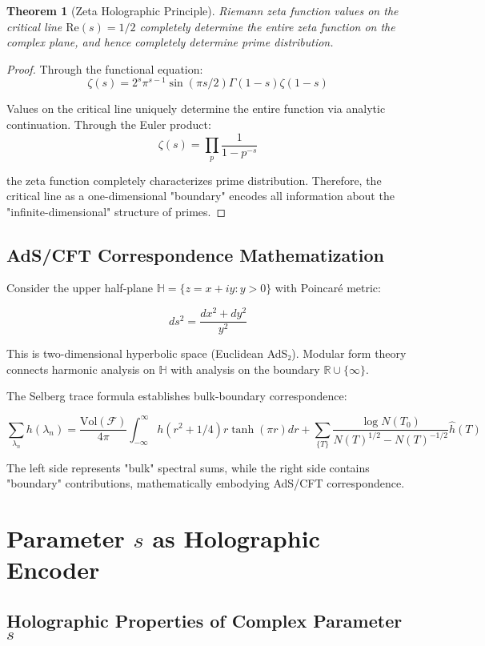 \documentclass[12pt]{article}
\newtheorem{theorem}{Theorem}[section]
\begin{document}
\begin{theorem}[Zeta Holographic Principle]
Riemann zeta function values on the critical line $\text{Re}(s) = 1/2$ completely determine the entire zeta function on the complex plane, and hence completely determine prime distribution.
\end{theorem}

\begin{proof}
Through the functional equation:
$$\zeta(s) = 2^s\pi^{s-1}\sin(\pi s/2)\Gamma(1-s)\zeta(1-s)$$

Values on the critical line uniquely determine the entire function via analytic continuation. Through the Euler product:
$$\zeta(s) = \prod_p \frac{1}{1-p^{-s}}$$

the zeta function completely characterizes prime distribution. Therefore, the critical line as a one-dimensional "boundary" encodes all information about the "infinite-dimensional" structure of primes.
\end{proof}

\subsection{AdS/CFT Correspondence Mathematization}

Consider the upper half-plane $\mathbb{H} = \{z = x + iy : y > 0\}$ with Poincaré metric:

$$ds^2 = \frac{dx^2 + dy^2}{y^2}$$

This is two-dimensional hyperbolic space (Euclidean AdS₂). Modular form theory connects harmonic analysis on $\mathbb{H}$ with analysis on the boundary $\mathbb{R} \cup \{\infty\}$.

The Selberg trace formula establishes bulk-boundary correspondence:

$$\sum_{\lambda_n} h(\lambda_n) = \frac{\text{Vol}(\mathcal{F})}{4\pi} \int_{-\infty}^{\infty} h(r^2 + 1/4) r\tanh(\pi r) dr + \sum_{\{T\}} \frac{\log N(T_0)}{N(T)^{1/2} - N(T)^{-1/2}} \hat{h}(T)$$

The left side represents "bulk" spectral sums, while the right side contains "boundary" contributions, mathematically embodying AdS/CFT correspondence.

\section{Parameter $s$ as Holographic Encoder}

\subsection{Holographic Properties of Complex Parameter $s$}
\end{document}
